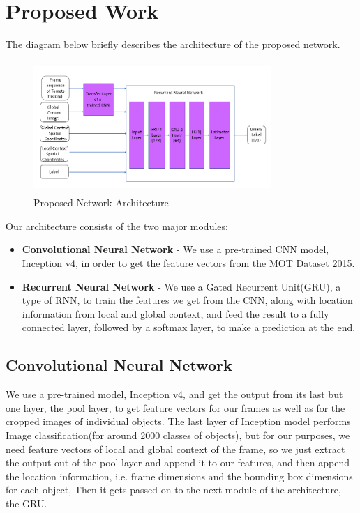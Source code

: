 \documentclass[journal]{IEEEtran}
\begin{document}
\section{Proposed Work}
The diagram below briefly describes the architecture of the proposed network.
\begin{figure}[ht!]
    \centering
    \includegraphics[width=9cm, height=5cm]{model_arch.PNG}
    \caption{Proposed Network Architecture}
    \label{fig:model_arch}
\end{figure}
\newline
Our architecture consists of the two major modules:
\begin{itemize}
    \item \textbf{Convolutional Neural Network} - We use a pre-trained CNN model, Inception v4, in order to get the feature vectors from the MOT Dataset 2015.
    \item \textbf{Recurrent Neural Network} -  We use a Gated Recurrent Unit(GRU), a type of RNN, to train the features we get from the CNN, along with location information from local and global context, and feed the result to a fully connected layer, followed by a softmax layer, to make a prediction at the end.
\end{itemize}

\subsection{Convolutional Neural Network}
We use a pre-trained model, Inception v4, and get the output from its last but one layer, the pool layer, to get feature vectors for our frames as well as for the cropped images of individual objects. The last layer of Inception model performs Image classification(for around 2000 classes of objects), but for our purposes, we need feature vectors of local and global context of the frame, so we just extract the output out of the pool layer and append it to our features, and then append the location information, i.e. frame dimensions and the bounding box dimensions for each object, Then it gets passed on to the next module of the architecture, the GRU.
\end{document}
